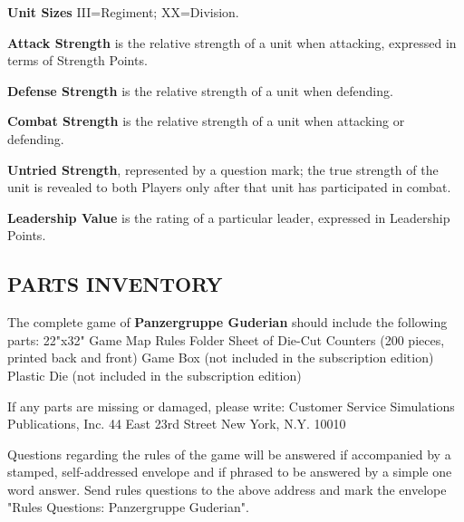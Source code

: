\textbf{Unit Sizes}
III=Regiment; XX=Division.

\textbf{Attack Strength} is the relative strength of a unit when attacking, expressed in terms of Strength Points.

\textbf{Defense Strength} is the relative strength of a unit when defending.

\textbf{Combat Strength} is the relative strength of a unit when attacking or defending.

\textbf{Untried Strength}, represented by a question mark; the true strength of the unit is revealed to both Players only after that unit has participated in combat.

\textbf{Leadership Value} is the rating of a particular leader, expressed in Leadership Points.

\subsection{PARTS INVENTORY}

The complete game of \textbf{Panzergruppe Guderian} should include the following parts:
22"x32" Game Map
Rules Folder
Sheet of Die-Cut Counters (200 pieces, printed back and front)
Game Box (not included in the subscription edition)
Plastic Die (not included in the subscription edition)

If any parts are missing or damaged, please write:
Customer Service
Simulations Publications, Inc.
44 East 23rd Street
New York, N.Y. 10010

Questions regarding the rules of the game will be answered if accompanied by a stamped, self-addressed envelope and if phrased to be answered by a simple one word answer. Send rules questions to the above address and mark the envelope "Rules Questions: Panzergruppe Guderian".